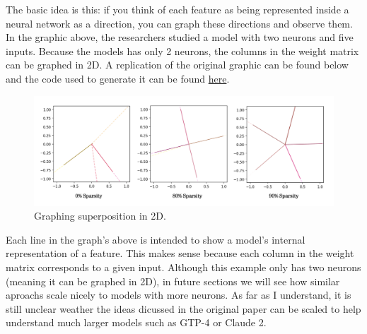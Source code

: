 \documentclass{article} %
\begin{document}
The basic idea is this: if you think of each feature as being represented inside a
neural network as a direction, you can graph these directions and observe them.
In the graphic above, the researchers studied a model with two neurons and five inputs.
Because the models has only 2 neurons, the columns in the weight matrix can be graphed in 2D.
A replication of the original graphic can be found below and the code used to 
generate it can be found \href{https://github.com/zroe1/toy_models_of_superposition/blob/main/section_1/section_1.ipynb}{here}. 

\begin{figure}[h]
    \centering
    \includegraphics[width=0.68\linewidth]{section_1/images/section1_replicated_graphic.png}
    \captionsetup{font=footnotesize} %
    \caption{Graphing superposition in 2D.}
    \label{fig:section1_replication}
\end{figure}

Each line in the graph's above is intended to show a model's internal representation
of a feature. This makes sense because each column in the weight matrix
corresponds to a given input. Although this example only has two neurons (meaning 
it can be graphed in 2D), in future sections we will see how similar aproachs 
scale nicely to models with more neurons. As far as I understand, it is still 
unclear weather the ideas dicussed in the original paper can be scaled to help 
understand much larger models such as GTP-4 or Claude 2.
\end{document}
